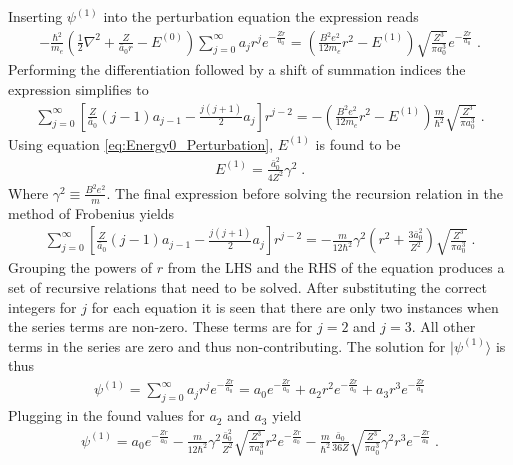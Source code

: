         \noindent Inserting $\psi^{(1)}$ into the perturbation equation the expression reads 
        \begin{align}
            -\frac{\hbar^2}{m_e} \left(\frac{1}{2} \nabla^2 + \frac{Z}{\bar{a}_0 r} - E^{(0)} \right) \sum_{j = 0}^\infty a_j r^j e^{-\frac{Zr}{a_0}} = \left(\frac{B^2e^2}{12m_e}r^2 - E^{(1)} \right) \sqrt{\frac{Z^3}{\pi a_0^3}}e^{-\frac{Zr}{a_0}}\;.
        \end{align}
        \noindent Performing the differentiation followed by a shift of summation indices the expression simplifies to
        \begin{align}
            \sum_{j = 0}^\infty \left[ \frac{Z}{\bar{a}_0}(j - 1)a_{j-1} - \frac{j(j+1)}{2}a_j \right]r^{j-2} = -\left(\frac{B^2e^2}{12m_e}r^2 - E^{(1)} \right) \frac{m}{\hbar^2}\sqrt{\frac{Z^3}{\pi a_0^3}}\;.\label{eq:Result_r^2_sum}
        \end{align}
        \noindent Using equation \eqref{eq:Energy0_Perturbation}, $E^{(1)}$ is found to be 
        \begin{align}
            E^{(1)} = \frac{\bar{a}_0^2}{4Z^2} \gamma^2\;.
        \end{align}
        \noindent Where $\gamma^2 \equiv \frac{B^2 e^2}{m}$. The final expression before solving the recursion relation in the method of Frobenius yields 
        \begin{align}
            \sum_{j = 0}^\infty \left[ \frac{Z}{\bar{a}_0}(j - 1)a_{j-1} - \frac{j(j+1)}{2}a_j \right]r^{j-2} = -\frac{m}{12\hbar^2} \gamma^2 \left(r^2 + \frac{3\bar{a}_0^2}{Z^2} \right) \sqrt{\frac{Z^3}{\pi a_0^3}}\;.
        \end{align}
        Grouping the powers of $r$ from the LHS and the RHS of the equation produces a set of recursive relations that need to be solved. After substituting the correct integers for $j$ for each equation it is seen that there are only two instances when the series terms are non-zero. These terms are for $j = 2$ and $j = 3$. All other terms in the series are zero and thus non-contributing. The solution for $\vert \psi^{(1)} \rangle$ is thus 
        \begin{align}
            \psi^{(1)} = \sum_{j = 0}^\infty a_j r^j e^{-\frac{Zr}{a_0}} = a_0 e^{-\frac{Zr}{a_0}} + a_2 r^2 e^{-\frac{Zr}{a_0}} + a_3 r^3 e^{-\frac{Zr}{a_0}}
        \end{align}
        \noindent Plugging in the found values for $a_2$ and $a_3$ yield 
        \begin{align}
            \psi^{(1)} = a_0 e^{-\frac{Zr}{a_0}} -\frac{m}{12\hbar^2} \gamma^2 \frac{\bar{a}_0^2}{Z^2} \sqrt{\frac{Z^3}{\pi a_0^3}} r^2 e^{-\frac{Zr}{a_0}} -\frac{m}{\hbar^2}\frac{\bar{a}_0}{36Z}\sqrt{\frac{Z^3}{\pi a_0^3}} \gamma^2 r^3 e^{-\frac{Zr}{a_0}}\;.
        \end{align}
